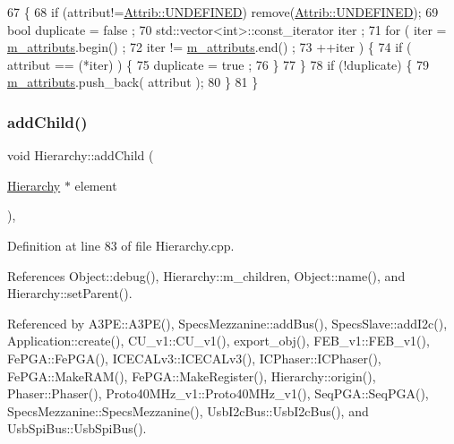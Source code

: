 \begin{DoxyCode}
67                             \{
68     \textcolor{keywordflow}{if} (attribut!=\hyperlink{classAttrib_a69e171d7cc6417835a5a306d3c764235a3a8da2ab97dda18aebab196fe4100531}{Attrib::UNDEFINED}) \textcolor{keyword}{remove}(\hyperlink{classAttrib_a69e171d7cc6417835a5a306d3c764235a3a8da2ab97dda18aebab196fe4100531}{Attrib::UNDEFINED});
69     \textcolor{keywordtype}{bool} duplicate = false ;
70     std::vector<int>::const\_iterator iter ;
71     \textcolor{keywordflow}{for} ( iter  = \hyperlink{classAttrib_ac4bd58a0cc6b38a3b711d609a3d3aacc}{m\_attributs}.begin() ;
72           iter != \hyperlink{classAttrib_ac4bd58a0cc6b38a3b711d609a3d3aacc}{m\_attributs}.end()   ;
73           ++iter ) \{
74       \textcolor{keywordflow}{if} ( attribut == (*iter) ) \{
75         duplicate = true ;
76       \}
77     \}
78     \textcolor{keywordflow}{if} (!duplicate) \{
79       \hyperlink{classAttrib_ac4bd58a0cc6b38a3b711d609a3d3aacc}{m\_attributs}.push\_back( attribut );
80     \}
81   \}
\end{DoxyCode}
\mbox{\label{classHierarchy_ad677774ff38fcb257c04a3a10d471fac}} 
\subsubsection{\texorpdfstring{add\+Child()}{addChild()}}
{\footnotesize\ttfamily void Hierarchy\+::add\+Child (\begin{DoxyParamCaption}\item[{\hyperlink{classHierarchy}{Hierarchy} $\ast$}]{element }\end{DoxyParamCaption})\hspace{0.3cm}{\ttfamily [virtual]}, {\ttfamily [inherited]}}



Definition at line 83 of file Hierarchy.\+cpp.



References Object\+::debug(), Hierarchy\+::m\+\_\+children, Object\+::name(), and Hierarchy\+::set\+Parent().



Referenced by A3\+P\+E\+::\+A3\+P\+E(), Specs\+Mezzanine\+::add\+Bus(), Specs\+Slave\+::add\+I2c(), Application\+::create(), C\+U\+\_\+v1\+::\+C\+U\+\_\+v1(), export\+\_\+obj(), F\+E\+B\+\_\+v1\+::\+F\+E\+B\+\_\+v1(), Fe\+P\+G\+A\+::\+Fe\+P\+G\+A(), I\+C\+E\+C\+A\+Lv3\+::\+I\+C\+E\+C\+A\+Lv3(), I\+C\+Phaser\+::\+I\+C\+Phaser(), Fe\+P\+G\+A\+::\+Make\+R\+A\+M(), Fe\+P\+G\+A\+::\+Make\+Register(), Hierarchy\+::origin(), Phaser\+::\+Phaser(), Proto40\+M\+Hz\+\_\+v1\+::\+Proto40\+M\+Hz\+\_\+v1(), Seq\+P\+G\+A\+::\+Seq\+P\+G\+A(), Specs\+Mezzanine\+::\+Specs\+Mezzanine(), Usb\+I2c\+Bus\+::\+Usb\+I2c\+Bus(), and Usb\+Spi\+Bus\+::\+Usb\+Spi\+Bus().


